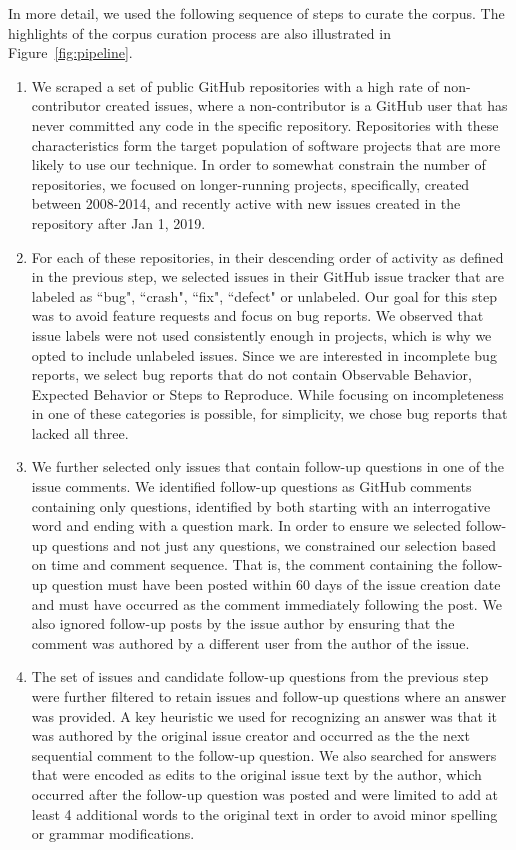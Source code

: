 In more detail, we used the following sequence of steps to curate the corpus. The highlights of the corpus curation process are also illustrated in Figure~\ref{fig:pipeline}.
\begin{enumerate}
\item We scraped a set of public GitHub repositories with a high rate of
non-contributor created issues, where a non-contributor is a GitHub user that has never
committed any code in the specific repository. Repositories with these characteristics form
the target population of software projects that are more likely to use our technique. In order
to somewhat constrain  the number of repositories, we focused on longer-running projects,
specifically, created between 2008-2014, and recently active with new issues created in the repository after Jan 1, 2019.
\item For each of these repositories, in their descending order of activity as defined in the previous step,
we selected issues in their GitHub issue tracker that are labeled as ``bug", ``crash", ``fix", ``defect" or unlabeled. Our goal for this step was
to avoid feature requests and focus on bug reports. We observed that issue labels were not used consistently enough
in projects, which is why we opted to include unlabeled issues. Since we are interested in incomplete bug reports, we select bug reports that do not contain Observable Behavior, Expected Behavior or Steps to Reproduce. While focusing on incompleteness in one of these categories is possible, for simplicity, we chose bug reports that lacked all three.
\item We further selected only issues that contain follow-up questions in one of the issue comments.  We identified follow-up questions as GitHub comments containing only questions, identified by both starting with an interrogative word and ending with a question mark. In order to ensure we selected follow-up questions and not just
any questions, we constrained our selection based on time and comment sequence. That is, the comment containing the follow-up question must have been posted within 60 days of the issue creation date and must have occurred as the comment immediately following the post. We also ignored follow-up posts by the issue author by ensuring that the comment was authored by a different user from the author of the issue.
\item The set of issues and candidate follow-up questions from the previous step were further filtered to
retain issues and follow-up questions where an answer was provided. A key heuristic we used for recognizing an answer was that it was authored
by the original issue creator and occurred as the the next sequential comment
to the follow-up question. We also searched for answers that were encoded as edits to the original issue text by the author, which occurred after the follow-up question was posted and were limited to add at least 4 additional words to the original text in order to avoid minor spelling or grammar modifications.
\end{enumerate}

